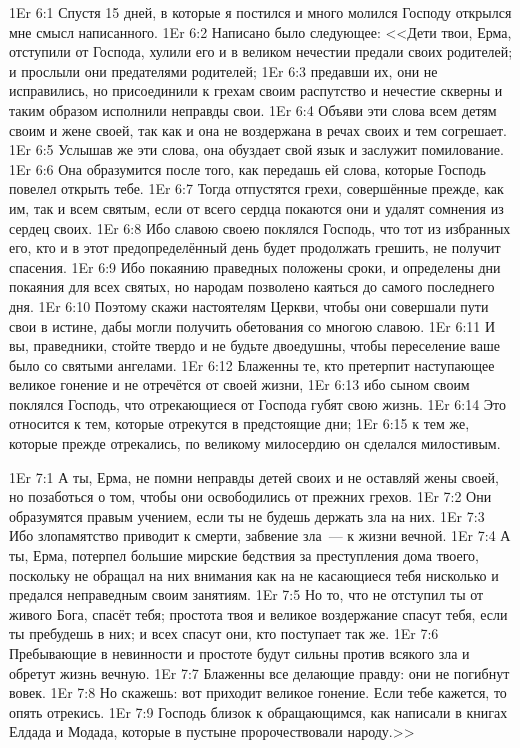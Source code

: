 \vs 1Er 6:1
Спустя 15 дней, в которые я постился
и много молился Господу открылся мне смысл написанного.
\vs 1Er 6:2
Написано было следующее:
<<Дети твои, Ерма, отступили от Господа, хулили его и в великом нечестии
предали своих родителей; и прослыли они предателями родителей;
\vs 1Er 6:3
предавши их, они не исправились,
но присоединили к грехам своим распутство и нечестие скверны и
таким образом исполнили неправды свои.
\vs 1Er 6:4
Объяви эти слова всем детям своим и жене своей,
так как и она не воздержана в речах своих и тем согрешает.
\vs 1Er 6:5
Услышав же эти слова, она обуздает свой язык
и заслужит помилование.
\vs 1Er 6:6
Она образумится после того, как передашь ей слова,
которые Господь повелел открыть тебе.
\vs 1Er 6:7
Тогда отпустятся грехи, совершённые прежде,
как им, так и всем святым, если от всего сердца покаются
они и удалят сомнения из сердец своих.
\vs 1Er 6:8
Ибо славою своею поклялся Господь,
что тот из избранных его, кто и в этот предопределённый день будет
продолжать грешить, не получит спасения.
\vs 1Er 6:9
Ибо покаянию праведных положены сроки,
и определены дни покаяния для всех святых,
но народам позволено каяться до самого последнего дня.
\vs 1Er 6:10
Поэтому скажи настоятелям Церкви,
чтобы они совершали пути свои в истине,
дабы могли получить обетования со многою славою.
\vs 1Er 6:11
И вы, праведники, стойте твердо и не будьте двоедушны,
чтобы переселение ваше было со святыми ангелами.
\vs 1Er 6:12
Блаженны те, кто претерпит наступающее великое гонение
и не отречётся от своей жизни,
\vs 1Er 6:13
ибо сыном своим поклялся Господь,
что отрекающиеся от Господа губят свою жизнь.
\vs 1Er 6:14
Это относится к тем, которые отрекутся в предстоящие дни;
\vs 1Er 6:15
к тем же, которые прежде отрекались,
по великому милосердию он сделался милостивым.

\vs 1Er 7:1
А ты, Ерма, не помни неправды детей своих
и не оставляй жены своей, но позаботься о том, чтобы они
освободились от прежних грехов.
\vs 1Er 7:2
Они образумятся правым
учением, если ты не будешь держать зла на них.
\vs 1Er 7:3
Ибо злопамятство приводит
к смерти, забвение зла~--- к жизни вечной.
\vs 1Er 7:4
А ты, Ерма, потерпел большие мирские бедствия
за преступления дома твоего, поскольку не обращал на
них внимания как на не касающиеся тебя нисколько
и предался неправедным своим занятиям.
\vs 1Er 7:5
Но то, что не отступил ты от живого Бога, спасёт тебя;
простота твоя и великое воздержание спасут тебя,
если ты пребудешь в них; и всех спасут они,
кто поступает так же.
\vs 1Er 7:6
Пребывающие в невинности и простоте будут
сильны против всякого зла и обретут жизнь вечную.
\vs 1Er 7:7
Блаженны все делающие правду: они не погибнут вовек.
\vs 1Er 7:8
Но скажешь: вот приходит великое гонение.
Если тебе кажется, то опять отрекись.
\vs 1Er 7:9
Господь близок к обращающимся,
как написали в книгах Елдада и Модада,
которые в пустыне пророчествовали народу.>>

